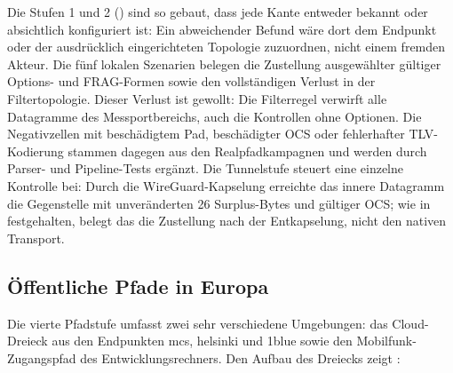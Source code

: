 Die Stufen 1 und 2 () sind so gebaut, dass jede Kante entweder bekannt oder
absichtlich konfiguriert ist: Ein abweichender Befund wäre dort dem Endpunkt oder der ausdrücklich
eingerichteten Topologie zuzuordnen, nicht einem fremden Akteur. Die fünf lokalen Szenarien belegen die
Zustellung ausgewählter gültiger Options- und FRAG-Formen sowie den vollständigen Verlust in der
Filter\-topologie. Dieser Verlust ist gewollt: Die Filterregel verwirft alle Datagramme des Messportbereichs, auch
die Kontrollen ohne Optionen. Die Negativzellen mit beschädigtem Pad, beschädigter OCS oder fehlerhafter TLV-Kodierung
stammen dagegen aus den Realpfadkampagnen und werden durch Parser- und Pipeline-Tests ergänzt. Die
Tunnelstufe steuert eine einzelne Kontrolle bei: Durch die WireGuard-Kapselung erreichte das innere
Datagramm die Gegenstelle mit unveränderten 26 Surplus-Bytes und gültiger OCS; wie in
 festgehalten, belegt das die Zustellung nach der Entkapselung, nicht den nativen
Transport.

\subsection{Öffentliche Pfade in Europa}
\label{subsec:eval-europa}

Die vierte Pfadstufe umfasst zwei sehr verschiedene Umgebungen: das Cloud-Dreieck aus den Endpunkten mcs,
helsinki und 1blue sowie den Mobilfunk-Zugangspfad des Entwicklungsrechners. Den Aufbau des Dreiecks zeigt
:

